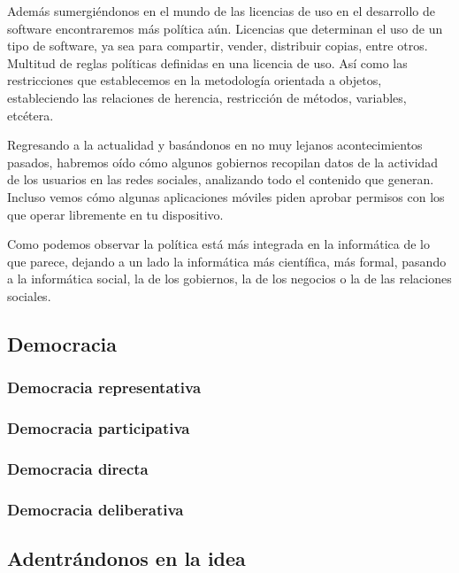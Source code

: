 Además sumergiéndonos en el mundo de las licencias de uso en el desarrollo de software encontraremos más política aún. Licencias que determinan el uso de un tipo de software, ya sea para compartir, vender, distribuir copias, entre otros. Multitud de reglas políticas definidas en una licencia de uso. Así como las restricciones que establecemos en la metodología orientada a objetos, estableciendo las relaciones de herencia, restricción de métodos, variables, etcétera.

Regresando a la actualidad y basándonos en no muy lejanos acontecimientos pasados, habremos oído cómo algunos gobiernos recopilan datos de la actividad de los usuarios en las redes sociales, analizando todo el contenido que generan. Incluso vemos cómo algunas aplicaciones móviles piden aprobar permisos con los que operar libremente en tu dispositivo.

Como podemos observar la política está más integrada en la informática de lo que parece, dejando a un lado la informática más científica, más formal, pasando a la informática social, la de los gobiernos, la de los negocios o la de las relaciones sociales.

\subsection{Democracia}

\subsubsection{Democracia representativa}

\subsubsection{Democracia participativa}

\subsubsection{Democracia directa}

\subsubsection{Democracia deliberativa}


\subsection{Adentrándonos en la idea}

